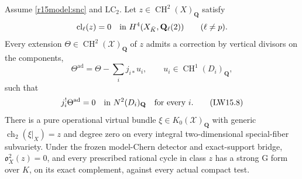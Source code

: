 \begin{theorem}
\label{r15model:lift}
Assume \eqref{r15model:snc} and $\mathrm{LC}_2$.
Let $z\in\operatorname{CH}^2(X)_{\mathbf Q}$ satisfy
\[
 \operatorname{cl}_\ell(z)=0
       \quad\hbox{in }H^4(X_{\bar K},\mathbf Q_\ell(2))
       \qquad(\ell\ne p).
\]
Every extension $\Theta\in\operatorname{CH}^2(\mathcal X)_{\mathbf Q}$
of $z$ admits a correction by vertical divisors on the components,
\[
 \Theta^{\mathrm{ad}}=\Theta-\sum_i j_{i*}u_i,
       \qquad u_i\in\operatorname{CH}^1(D_i)_{\mathbf Q},
\tag{LW15.7}\label{r15model:correction}
\]
such that
\[
         j_i^!\Theta^{\mathrm{ad}}=0
                         \quad\hbox{in }N^2(D_i)_{\mathbf Q}
                         \quad\hbox{for every }i.
\tag{LW15.8}\label{r15model:component-zero}
\]
There is a pure operational virtual bundle
$\xi\in K_0(\mathcal X)_{\mathbf Q}$ with generic
$\operatorname{ch}_2(\xi|_X)=z$ and degree zero on every
integral two-dimensional special-fiber subvariety.
Under the frozen model-Chern detector and exact-support bridge,
$\mathfrak o_X^2(z)=0$, and every prescribed rational cycle in
class $z$ has a strong G form over $K$, on its exact complement,
against every actual compact test.
\end{theorem}

